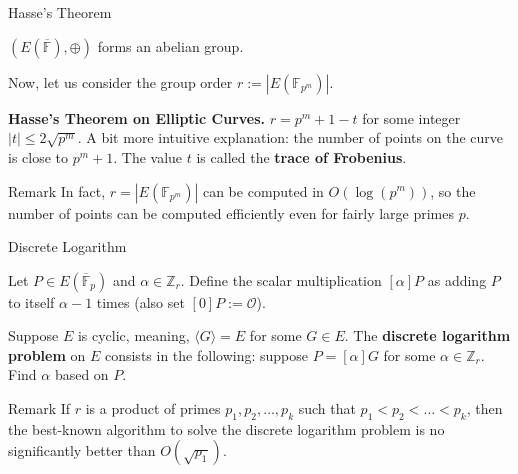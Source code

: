 \documentclass{zkdl-presentation-template}
\begin{document}
    \begin{frame}{Hasse's Theorem}
        \begin{theorem}
            $(E(\overline{\mathbb{F}}),\oplus)$ forms an abelian group.
        \end{theorem}
        \vspace{10px}

        Now, let us consider the group order $r := |E(\mathbb{F}_{p^m})|$.

        \begin{theorem}
            \textbf{Hasse's Theorem on Elliptic Curves.} $r = p^m + 1 - t$ for some integer $|t| \leq 2\sqrt{p^m}$. A bit more intuitive explanation: the number of points on the curve is close to $p^m+1$. The value $t$ is called the \textbf{trace of Frobenius}.
        \end{theorem}
        
        \begin{block}{Remark}
            In fact, $r=|E(\mathbb{F}_{p^m})|$ can be computed in $O(\log(p^m))$, so the number of points can be computed efficiently even for fairly large primes $p$.
        \end{block}
    \end{frame}

    \begin{frame}{Discrete Logarithm}
        \begin{definition}
           
            Let $P \in E(\overline{\mathbb{F}}_p)$ and $\alpha \in \mathbb{Z}_r$. Define the scalar multiplication $[\alpha]P$ as adding $P$ to itself $\alpha-1$ times (also set $[0]P := \mathcal{O}$).
            
        \end{definition}

        \begin{definition}
            Suppose $E$ is cyclic, meaning, $\langle G \rangle = E$ for some $G \in E$. The \textbf{discrete logarithm problem} on $E$ consists in the following: suppose $P = [\alpha]G$ for some $\alpha \in \mathbb{Z}_r$. Find $\alpha$ based on $P$.
        \end{definition}

        \begin{block}{Remark}
            If $r$ is a product of primes $p_1,p_2,\dots,p_k$ such that $p_1<p_2<\dots< p_k$, then the best-known algorithm to solve the discrete logarithm problem is no significantly better than $O(\sqrt{p_1})$.
        \end{block}
    \end{frame}
\end{document}
